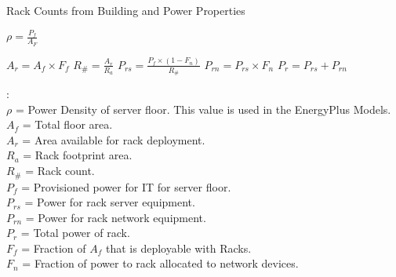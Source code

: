   \begin{algorithm}
    \caption{Rack Counts from Building and Power Properties}
    \begin{algorithmic}

      \STATE $\rho= \frac{P_{f}}{A_{F}}$

      \STATE $A_{r}= A_{f} \times F_{f}$
      \STATE $R_{\#}= \frac{A_{r}}{R_{a}}$
      \STATE $P_{rs} = \frac{P_f \times (1-F_{n})}{R_{\#}}$
      \STATE $P_{rn} = P_{rs} \times F_{n}$
      \STATE $P_r = P_{rs} + P_{rn}$
      
      : \\
        \hspace{.2in}$\rho$ = Power Density of server floor. This value is used in the EnergyPlus Models. \\
        \hspace{.2in}$A_{f}$ = Total floor area.  \\
        \hspace{.2in}$A_{r}$ = Area available for rack deployment.  \\
        \hspace{.2in}$R_{a}$ = Rack footprint area. \\
        \hspace{.2in}$R_{\#}$ = Rack count.\\
        \hspace{.2in}$P_{f}$ = Provisioned power for IT for server floor.\\
        \hspace{.2in}$P_{rs}$ = Power for rack server equipment. \\
        \hspace{.2in}$P_{rn}$ = Power for rack network equipment. \\
        \hspace{.2in}$P_{r}$ = Total power of rack. \\
        \hspace{.2in}$F_{f}$ = Fraction of $A_{f}$ that is deployable with Racks.\\
        \hspace{.2in}$F_{n}$ = Fraction of power to rack allocated to network devices.
        
    \end{algorithmic}
    \label{rack_power_counts_bem}
  \end{algorithm}